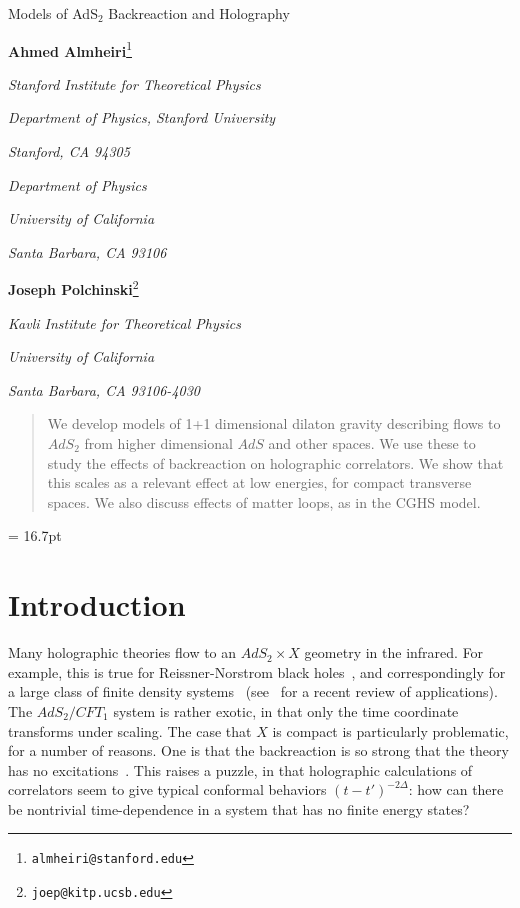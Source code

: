 \documentclass[12pt]{article}
\newcommand{\sect}[1]{\section{#1}\setcounter{equation}{0}}
\begin{document}

\begin{titlepage}
\bigskip
\bigskip\bigskip\bigskip
\centerline{\Large  Models of AdS$_2$ Backreaction and Holography}
\bigskip\bigskip\bigskip
 \centerline{{\bf Ahmed Almheiri}\footnote{\tt almheiri@stanford.edu}}
\medskip
\centerline{\em Stanford Institute for Theoretical Physics}
\centerline{\em Department of Physics, Stanford University}
\centerline{\em Stanford, CA 94305}
\bigskip 
\centerline{\em Department of Physics}
\centerline{\em University of California}
\centerline{\em Santa Barbara, CA 93106}\bigskip
\bigskip
 \centerline{{\bf Joseph Polchinski}\footnote{\tt joep@kitp.ucsb.edu}}
\medskip
\centerline{\em Kavli Institute for Theoretical Physics}
\centerline{\em University of California}
\centerline{\em Santa Barbara, CA 93106-4030}\bigskip
\bigskip
\bigskip\bigskip

\begin{abstract}
We develop models of 1+1 dimensional dilaton gravity describing flows to $AdS_2$ from higher dimensional $AdS$ and other spaces.  We use these to study the effects of backreaction on holographic correlators.  We show that this scales as a relevant effect at low energies, for compact transverse spaces.  We also discuss effects of matter loops, as in the CGHS model.
\end{abstract}
\end{titlepage}

\baselineskip = 16.7pt

\tableofcontents


\setcounter{footnote}{0}

\bigskip
\bigskip
\sect{Introduction}

Many holographic theories flow to an $AdS_2 \times X$ geometry in the infrared.  For example, this is true for Reissner-Norstrom black holes~\cite{BR}, and correspondingly for a large class of finite density systems~\cite{Chamblin:1999tk} (see~\cite{Iqbal:2011in} for a recent review of applications).  The $AdS_2/CFT_1$ system is rather exotic, in that only the time coordinate transforms under scaling.  The case that $X$ is compact is particularly problematic, for a number of reasons.  One is that the backreaction is so strong that the theory has no excitations~\cite{Maldacena:1998uz}.  This raises a puzzle, in that holographic calculations of correlators seem to give typical conformal behaviors $(t-t')^{-2\Delta}$: how can there be nontrivial time-dependence in a system that has no finite energy states?
\end{document}
